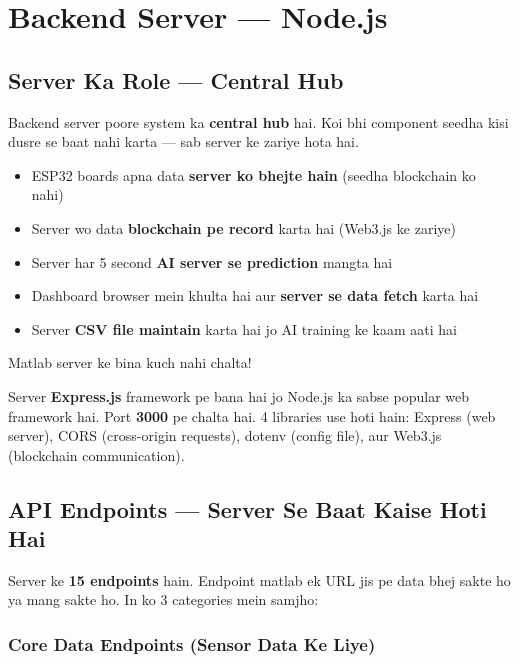 \chapter{Backend Server --- Node.js}

\section{Server Ka Role --- Central Hub}

Backend server poore system ka \textbf{central hub} hai. Koi bhi component seedha kisi dusre se baat nahi karta --- sab server ke zariye hota hai.

\begin{conceptbox}
\begin{itemize}[nosep]
    \item ESP32 boards apna data \textbf{server ko bhejte hain} (seedha blockchain ko nahi)
    \item Server wo data \textbf{blockchain pe record} karta hai (Web3.js ke zariye)
    \item Server har 5 second \textbf{AI server se prediction} mangta hai
    \item Dashboard browser mein khulta hai aur \textbf{server se data fetch} karta hai
    \item Server \textbf{CSV file maintain} karta hai jo AI training ke kaam aati hai
\end{itemize}
Matlab server ke bina kuch nahi chalta!
\end{conceptbox}

Server \textbf{Express.js} framework pe bana hai jo Node.js ka sabse popular web framework hai. Port \textbf{3000} pe chalta hai. 4 libraries use hoti hain: Express (web server), CORS (cross-origin requests), dotenv (config file), aur Web3.js (blockchain communication).

\section{API Endpoints --- Server Se Baat Kaise Hoti Hai}

Server ke \textbf{15 endpoints} hain. Endpoint matlab ek URL jis pe data bhej sakte ho ya mang sakte ho. In ko 3 categories mein samjho:

\subsection{Core Data Endpoints (Sensor Data Ke Liye)}

